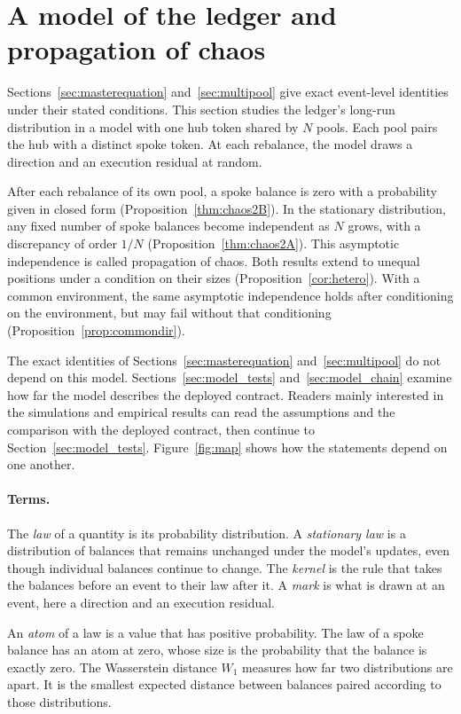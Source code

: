 \documentclass[11pt,a4paper]{article}
\theoremstyle{siphon}
\begin{document}
\section{A model of the ledger and propagation of chaos}\label{sec:chaos}

Sections~\ref{sec:masterequation} and~\ref{sec:multipool} give exact event-level identities under their stated conditions. This section studies the ledger's long-run distribution in a model with one hub token shared by $N$ pools. Each pool pairs the hub with a distinct spoke token. At each rebalance, the model draws a direction and an execution residual at random.

After each rebalance of its own pool, a spoke balance is zero with a probability given in closed form (Proposition~\ref{thm:chaos2B}). In the stationary distribution, any fixed number of spoke balances become independent as $N$ grows, with a discrepancy of order $1/N$ (Proposition~\ref{thm:chaos2A}). This asymptotic independence is called propagation of chaos\cite{sznitman1991}. Both results extend to unequal positions under a condition on their sizes (Proposition~\ref{cor:hetero}). With a common environment, the same asymptotic independence holds after conditioning on the environment, but may fail without that conditioning (Proposition~\ref{prop:commondir}).

The exact identities of Sections~\ref{sec:masterequation} and~\ref{sec:multipool} do not depend on this model. Sections~\ref{sec:model_tests} and~\ref{sec:model_chain} examine how far the model describes the deployed contract. Readers mainly interested in the simulations and empirical results can read the assumptions and the comparison with the deployed contract, then continue to Section~\ref{sec:model_tests}. Figure~\ref{fig:map} shows how the statements depend on one another.

\paragraph{Terms.} The \emph{law} of a quantity is its probability distribution. A \emph{stationary law} is a distribution of balances that remains unchanged under the model's updates, even though individual balances continue to change. The \emph{kernel} is the rule that takes the balances before an event to their law after it. A \emph{mark} is what is drawn at an event, here a direction and an execution residual.

An \emph{atom} of a law is a value that has positive probability. The law of a spoke balance has an atom at zero, whose size is the probability that the balance is exactly zero. The Wasserstein distance $W_1$ measures how far two distributions are apart. It is the smallest expected distance between balances paired according to those distributions.
\end{document}
